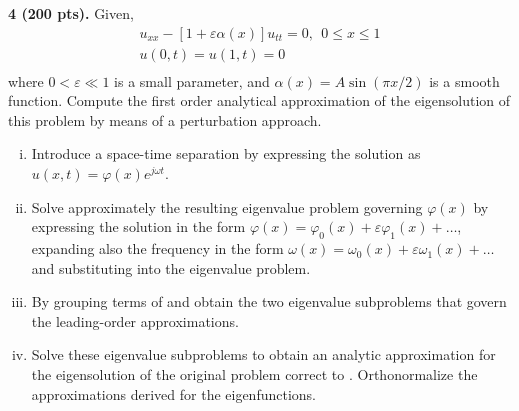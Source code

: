 \newpage
\begin{problem}
    \textbf{4 (200 pts).} 
    Given, 
    \begin{equation}\label{eqn:hw5_p4_gov_eqns}
    \begin{gathered}
        u_{xx} - [1 + \varepsilon \alpha(x)]u_{tt} = 0, ~~ 0 \leq x \leq 1 \\
        u(0, t) = u(1, t) = 0 \\
    \end{gathered}
    \end{equation}
    where $0 < \varepsilon \ll 1$ is a small parameter, and $\alpha(x) = A\sin(\pi x / 2)$ is a smooth function.
    Compute the first order analytical approximation of the eigensolution of this problem by means of a
    perturbation approach.
    \begin{enumerate}[(i)]
        \item {
            Introduce a space-time separation by expressing the solution as $u(x, t) = \varphi(x) e^{j\omega t}$.
        }
        \item {
            Solve approximately the resulting eigenvalue problem governing $\varphi(x)$ by expressing the solution in the form $\varphi(x) = \varphi_0(x) + \varepsilon \varphi_1(x) + \ldots$, expanding also the frequency in the form $\omega(x) = \omega_0(x) + \varepsilon \omega_1(x) + \ldots$ and substituting into the eigenvalue problem.
        }
        \item {
            By grouping terms of  and \order{\varepsilon} obtain the two eigenvalue subproblems that govern the leading-order approximations. 
        }
        \item {
            Solve these eigenvalue subproblems to obtain an analytic approximation for the eigensolution of the original problem correct to \order{\varepsilon}. 
            Orthonormalize the approximations derived for the eigenfunctions.
        }
    \end{enumerate}
\end{problem}

